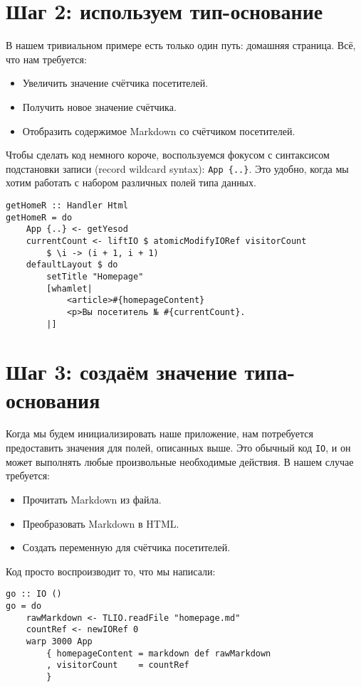 \section{Шаг 2: используем тип-основание}
В нашем тривиальном примере есть только один путь: домашняя страница. Всё, что
нам требуется:
\begin{itemize}
    \item Увеличить значение счётчика посетителей.
    \item Получить новое значение счётчика.
    \item Отобразить содержимое Markdown со счётчиком посетителей.
\end{itemize}

Чтобы сделать код немного короче, воспользуемся фокусом с синтаксисом
подстановки записи (record wildcard syntax): \lstinline'App {..}'. Это удобно,
когда мы хотим работать с набором различных полей типа данных.
\begin{lstlisting}
getHomeR :: Handler Html
getHomeR = do
    App {..} <- getYesod
    currentCount <- liftIO $ atomicModifyIORef visitorCount
        $ \i -> (i + 1, i + 1)
    defaultLayout $ do
        setTitle "Homepage"
        [whamlet|
            <article>#{homepageContent}
            <p>Вы посетитель № #{currentCount}.
        |]
\end{lstlisting}

\section{Шаг 3: создаём значение типа-основания}
Когда мы будем инициализировать наше приложение, нам потребуется предоставить
значения для полей, описанных выше. Это обычный код \lstinline'IO', и он может
выполнять любые произвольные необходимые действия. В нашем случае требуется:
\begin{itemize}
    \item Прочитать Markdown из файла.
    \item Преобразовать Markdown в HTML.
    \item Создать переменную для счётчика посетителей.
\end{itemize}

Код просто воспроизводит то, что мы написали:
\begin{lstlisting}
go :: IO ()
go = do
    rawMarkdown <- TLIO.readFile "homepage.md"
    countRef <- newIORef 0
    warp 3000 App
        { homepageContent = markdown def rawMarkdown
        , visitorCount    = countRef
        }
\end{lstlisting}

